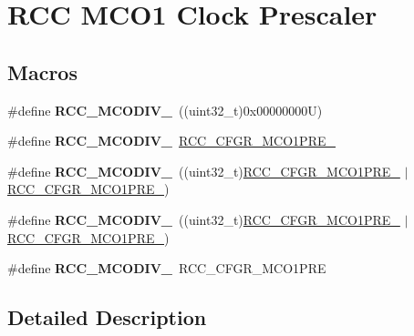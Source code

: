 \hypertarget{group___r_c_c___m_c_ox___clock___prescaler}{}\section{R\+CC M\+C\+O1 Clock Prescaler}
\label{group___r_c_c___m_c_ox___clock___prescaler}
\subsection*{Macros}
\begin{DoxyCompactItemize}
\item 
\mbox{\label{group___r_c_c___m_c_ox___clock___prescaler_ga438d8c3bead4e1ec5dd5757cb0313d53}} 
\#define {\bfseries R\+C\+C\+\_\+\+M\+C\+O\+D\+I\+V\+\_}~((uint32\+\_\+t)0x00000000\+U)
\item 
\mbox{\label{group___r_c_c___m_c_ox___clock___prescaler_ga6198330847077f4da351915518140bfc}} 
\#define {\bfseries R\+C\+C\+\_\+\+M\+C\+O\+D\+I\+V\+\_}~\mbox{\hyperlink{group___peripheral___registers___bits___definition_ga11e1d10d1b55e0d88d24212ea2c8ba6e}{R\+C\+C\+\_\+\+C\+F\+G\+R\+\_\+\+M\+C\+O1\+P\+R\+E\+\_}}
\item 
\mbox{\label{group___r_c_c___m_c_ox___clock___prescaler_gab9dac03733c3c5bd8877ef43bff3d5f4}} 
\#define {\bfseries R\+C\+C\+\_\+\+M\+C\+O\+D\+I\+V\+\_}~((uint32\+\_\+t)\mbox{\hyperlink{group___peripheral___registers___bits___definition_gac8007a9d6ee3fd88912aaf290746ae0e}{R\+C\+C\+\_\+\+C\+F\+G\+R\+\_\+\+M\+C\+O1\+P\+R\+E\+\_}} $\vert$ \mbox{\hyperlink{group___peripheral___registers___bits___definition_ga11e1d10d1b55e0d88d24212ea2c8ba6e}{R\+C\+C\+\_\+\+C\+F\+G\+R\+\_\+\+M\+C\+O1\+P\+R\+E\+\_}})
\item 
\mbox{\label{group___r_c_c___m_c_ox___clock___prescaler_ga1bdc2eb56aaeb53dc3ca5cd72f22d4c8}} 
\#define {\bfseries R\+C\+C\+\_\+\+M\+C\+O\+D\+I\+V\+\_}~((uint32\+\_\+t)\mbox{\hyperlink{group___peripheral___registers___bits___definition_gaaf7c1280f61d56b4897f9c876987e092}{R\+C\+C\+\_\+\+C\+F\+G\+R\+\_\+\+M\+C\+O1\+P\+R\+E\+\_}} $\vert$ \mbox{\hyperlink{group___peripheral___registers___bits___definition_ga11e1d10d1b55e0d88d24212ea2c8ba6e}{R\+C\+C\+\_\+\+C\+F\+G\+R\+\_\+\+M\+C\+O1\+P\+R\+E\+\_}})
\item 
\mbox{\label{group___r_c_c___m_c_ox___clock___prescaler_ga67292dd05ceb8189ec439d4ac4d58b88}} 
\#define {\bfseries R\+C\+C\+\_\+\+M\+C\+O\+D\+I\+V\+\_}~R\+C\+C\+\_\+\+C\+F\+G\+R\+\_\+\+M\+C\+O1\+P\+RE
\end{DoxyCompactItemize}


\subsection{Detailed Description}
